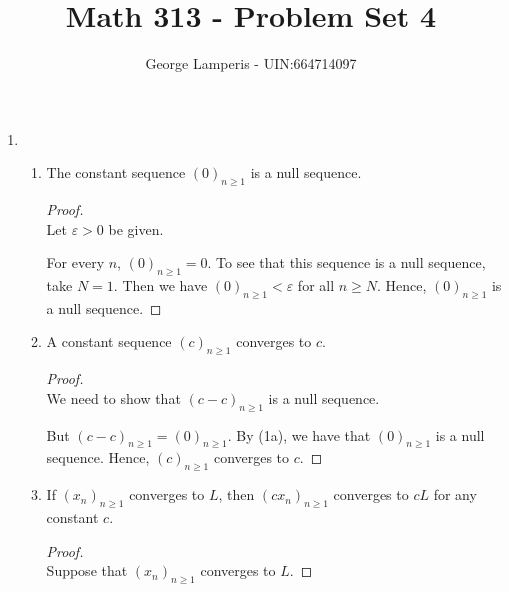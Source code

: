 \documentclass[12pt, letterpaper]{article}
\renewcommand{\epsilon}{\varepsilon}
\theoremstyle{definition} %
\begin{document}
\title{Math 313 - Problem Set 4}%
\author{George Lamperis - UIN:664714097} %
\date{}
\maketitle

\begin{enumerate}[label=\bfseries\arabic*.]

\item 
\begin{enumerate}[label=\bfseries(\alph*)]

    \item The constant sequence $(0)_{n \geq 1}$ is a null sequence.
    \begin{proof} ~\\
        Let $\epsilon > 0$ be given.

        For every $n$, $(0)_{n \geq 1} = 0$. To see that this sequence is a null 
        sequence, take $N=1$. Then we have $(0)_{n \geq 1} < \epsilon$ for all
        $n \geq N$. Hence, $(0)_{n \geq 1}$ is a null sequence.
    \end{proof}

    \item A constant sequence $(c)_{n \geq 1}$ converges to $c$.
    \begin{proof} ~\\
        We need to show that $(c-c)_{n \geq 1}$ is a null sequence. 

        But $(c-c)_{n \geq 1} = (0)_{n \geq 1}$. By (1a), we have that  
        $(0)_{n \geq 1}$ is a null sequence. Hence, $(c)_{n \geq 1}$ converges 
        to $c$.
    \end{proof}

    \item If $(x_n)_{n \geq 1}$ converges to $L$, then $(cx_n)_{n \geq 1}$ 
    converges to $cL$ for any constant $c$.

    \begin{proof} ~\\
        Suppose that $(x_n)_{n \geq 1}$ converges to $L$.  


\end{proof}
\end{enumerate}
\end{enumerate}
\end{document}
